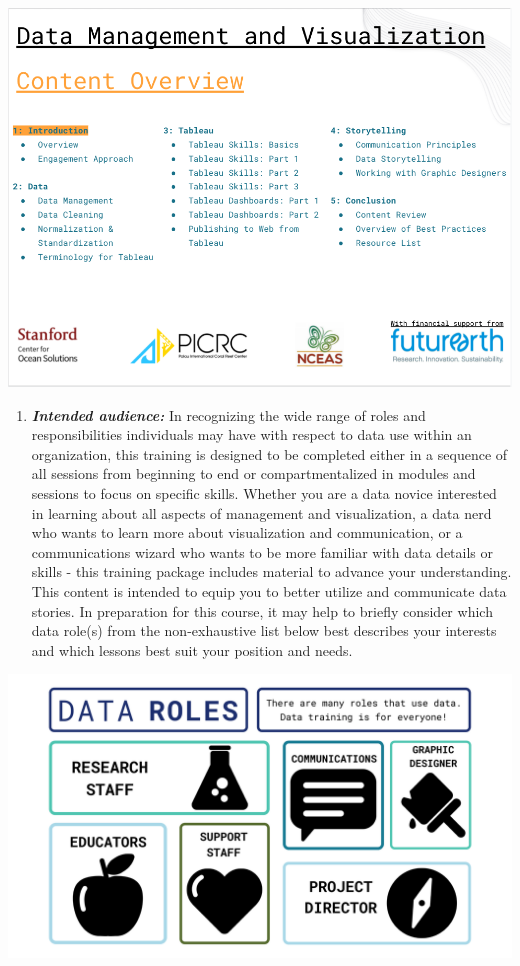 \documentclass[
]{book}
\providecommand{\tightlist}{%
  \setlength{\itemsep}{0pt}\setlength{\parskip}{0pt}}
\begin{document}
\includegraphics{images/Content_Overview_Intro.png}

\begin{enumerate}
\def\labelenumi{\arabic{enumi}.}
\setcounter{enumi}{3}
\tightlist
\item
  \textbf{\emph{Intended audience:}} In recognizing the wide range of roles and responsibilities individuals may have with respect to data use within an organization, this training is designed to be completed either in a sequence of all sessions from beginning to end or compartmentalized in modules and sessions to focus on specific skills. Whether you are a data novice interested in learning about all aspects of management and visualization, a data nerd who wants to learn more about visualization and communication, or a communications wizard who wants to be more familiar with data details or skills - this training package includes material to advance your understanding. This content is intended to equip you to better utilize and communicate data stories. In preparation for this course, it may help to briefly consider which data role(s) from the non-exhaustive list below best describes your interests and which lessons best suit your position and needs.
\end{enumerate}

\includegraphics{images/Data_Roles.png}
\end{document}
